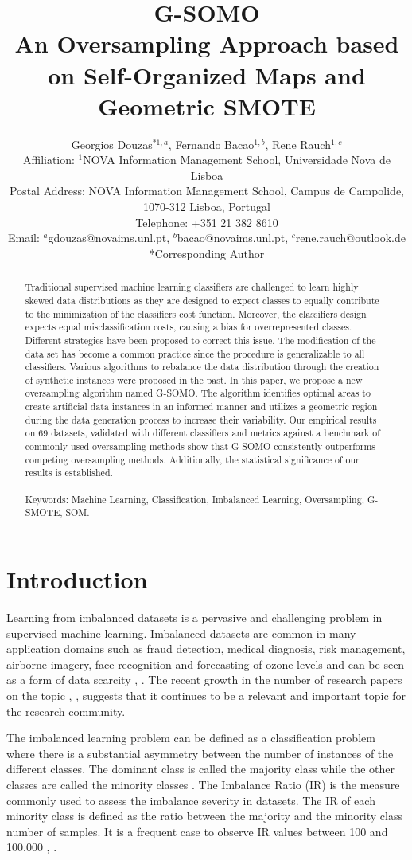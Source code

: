 \documentclass[parskip=full]{scrartcl}
\title{G-SOMO \\ \LARGE{An Oversampling Approach based on Self-Organized Maps and Geometric SMOTE}}
\author{
	Georgios Douzas\(^{* 1, a}\), Fernando Bacao\(^{1, b}\), Rene Rauch\(^{1, c}\) 
	\\
	\small{Affiliation: \(^{1}\)NOVA Information Management School, Universidade Nova de Lisboa}
	\\
	\small{Postal Address: NOVA Information Management School, Campus de Campolide, 1070-312 Lisboa, Portugal}
	\\
	\small{Telephone: +351 21 382 8610}
	\\
	\small{Email: \(^{a}\)gdouzas@novaims.unl.pt, \(^{b}\)bacao@novaims.unl.pt, \(^{c}\)rene.rauch@outlook.de}
	\\
	\small{*Corresponding Author}
}
\date{}
\begin{document}
\maketitle

\begin{abstract}
Traditional supervised machine learning classifiers are challenged to learn highly skewed data distributions as they are designed to expect classes to equally contribute to the minimization of the classifiers cost function. Moreover, the classifiers design expects equal misclassification costs, causing a bias for overrepresented classes. Different strategies have been proposed to correct this issue. The modification of the data set has become a common practice since the procedure is generalizable to all classifiers. Various algorithms to rebalance the data distribution through the creation of synthetic instances were proposed in the past. In this paper, we propose a new oversampling algorithm named G-SOMO. The algorithm identifies optimal areas to create artificial data instances in an informed manner and utilizes a geometric region during the data generation process to increase their variability. Our empirical results on 69 datasets, validated with different classifiers and metrics against a benchmark of commonly used oversampling methods show that G-SOMO consistently outperforms competing oversampling methods. Additionally, the statistical significance of our results is established.
\\
\\
Keywords: Machine Learning, Classification, Imbalanced Learning, Oversampling, G-SMOTE, SOM.
\end{abstract}

\section{Introduction}

Learning from imbalanced datasets is a pervasive and challenging problem in supervised machine learning. Imbalanced datasets are common in many application domains such as fraud detection, medical diagnosis, risk management, airborne imagery, face recognition and forecasting of ozone levels and can be seen as a form of data scarcity \cite{Vong2014}, \cite{He2009}. The recent growth in the number of research papers on the topic \cite{Haixiang2017}, \cite{Fernandez2018}, suggests that it continues to be a relevant and important topic for the research community.

The imbalanced learning problem can be defined as a classification problem where there is a substantial asymmetry between the number of instances of the different classes. The dominant class is called the majority class while the other classes are called the minority classes \cite{Chawla2003}. The Imbalance Ratio (IR) is the measure commonly used to assess the imbalance severity in datasets. The IR of each minority class is defined as the ratio between the majority and the minority class number of samples. It is a frequent case to observe IR values between 100 and 100.000 \cite{Chawla2002}, \cite{Barua2014}.
\end{document}
